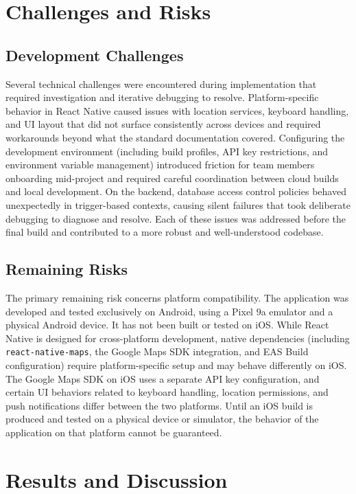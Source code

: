 \documentclass[sigconf]{acmart}
\begin{document}
\section{Challenges and Risks}
\label{sec:risks}
 \subsection{Development Challenges}
 
Several technical challenges were encountered during implementation that required investigation and iterative debugging to resolve. Platform-specific behavior in React Native caused issues with location services, keyboard handling, and UI layout that did not surface consistently across devices and required workarounds beyond what the standard documentation covered. Configuring the development environment (including build profiles, API key restrictions, and environment variable management) introduced friction for team members onboarding mid-project and required careful coordination between cloud builds and local development. On the backend, database access control policies behaved unexpectedly in trigger-based contexts, causing silent failures that took deliberate debugging to diagnose and resolve. Each of these issues was addressed before the final build and contributed to a more robust and well-understood codebase.
 
 
\subsection{Remaining Risks}
 
The primary remaining risk concerns platform compatibility. The application was developed and tested exclusively on Android, using a Pixel 9a emulator and a physical Android device. It has not been built or tested on iOS. While React Native is designed for cross-platform development, native dependencies (including \texttt{react-native-maps}, the Google Maps SDK integration, and EAS Build configuration) require platform-specific setup and may behave differently on iOS. The Google Maps SDK on iOS uses a separate API key configuration, and certain UI behaviors related to keyboard handling, location permissions, and push notifications differ between the two platforms. Until an iOS build is produced and tested on a physical device or simulator, the behavior of the application on that platform cannot be guaranteed.
 
 
\section{Results and Discussion}
\label{sec:results}
 
\end{document}
